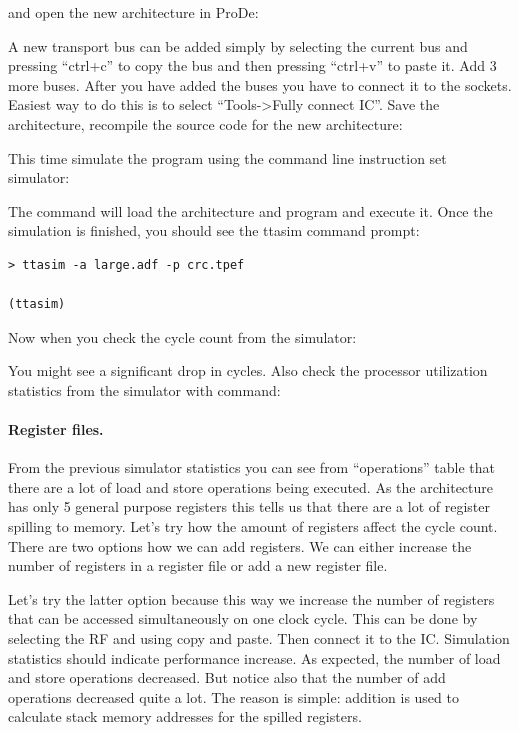 \documentclass[twoside]{tceusermanual}
\begin{document}

and open the new architecture in ProDe:


A new transport bus can be added simply by selecting the current bus and
pressing ``ctrl+c'' to copy the bus and then pressing ``ctrl+v'' to paste it.
Add 3 more buses. After you have added the buses you have to connect it to the
sockets. Easiest way to do this is to select ``Tools->Fully connect IC''.
Save the architecture, recompile the source code for the new architecture:


This time simulate the program using the command line instruction set simulator:


The command will load the architecture and program and execute
it. Once the simulation is finished, you should see the ttasim command prompt:

\begin{verbatim}
> ttasim -a large.adf -p crc.tpef

(ttasim) 
\end{verbatim}

Now when you check the cycle count from the simulator:


You might see a significant drop in cycles. 
Also check the processor utilization statistics from the simulator
with command:


\paragraph{Register files.}

From the previous simulator statistics you can see from ``operations'' table
that there are a lot of load and store operations being executed. As the
architecture has only 5 general purpose registers this tells us that there
are a lot of register spilling to memory. Let's try how the amount of registers affect
the cycle count. There are two options how we can add registers. We can either
increase the number of registers in a register file or add a new register file.

Let's try the latter option because this way we increase the number of registers
that can be accessed simultaneously on one clock cycle. This can be done by
selecting the RF and using copy and paste. Then connect it to the IC.
Simulation statistics should indicate performance increase. As expected, the
number of load and store operations decreased. But notice also that the number
of add operations decreased quite a lot. The reason is simple: addition is used
to calculate stack memory addresses for the spilled registers.
\end{document}

